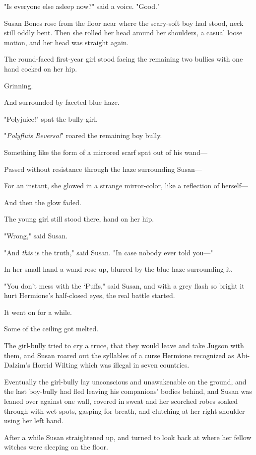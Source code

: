"Is everyone else asleep now?" said a voice. "Good."

Susan Bones rose from the floor near where the scary-soft boy had stood, neck 
still oddly bent. Then she rolled her head around her shoulders, a casual loose 
motion, and her head was straight again.

The round-faced first-year girl stood facing the remaining two bullies with one 
hand cocked on her hip.

Grinning.

And surrounded by faceted blue haze.

"Polyjuice!" spat the bully-girl.

"\emph{Polyfluis Reverso!}" roared the remaining boy bully.

Something like the form of a mirrored scarf spat out of his wand---

Passed without resistance through the haze surrounding Susan---

For an instant, she glowed in a strange mirror-color, like a reflection of 
herself---

And then the glow faded.

The young girl still stood there, hand on her hip.

"Wrong," said Susan.

"And \emph{this} is the truth," said Susan. "In case nobody ever told you---"

In her small hand a wand rose up, blurred by the blue haze surrounding it.

"You don't mess with the `Puffs," said Susan, and with a grey flash so bright 
it hurt Hermione's half-closed eyes, the real battle started.

It went on for a while.

Some of the ceiling got melted.

The girl-bully tried to cry a truce, that they would leave and take Jugson with 
them, and Susan roared out the syllables of a curse Hermione recognized as 
Abi-Dalzim's Horrid Wilting which was illegal in seven countries.

Eventually the girl-bully lay unconscious and unawakenable on the ground, and 
the last boy-bully had fled leaving his companions' bodies behind, and Susan 
was leaned over against one wall, covered in sweat and her scorched robes 
soaked through with wet spots, gasping for breath, and clutching at her right 
shoulder using her left hand.

After a while Susan straightened up, and turned to look back at where her 
fellow witches were sleeping on the floor.

